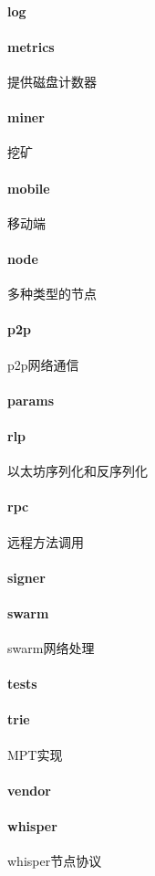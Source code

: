 \documentclass[UTF8]{ctexart}
\begin{document}
\paragraph{log}
\paragraph{metrics} 提供磁盘计数器
\paragraph{miner} 挖矿
\paragraph{mobile} 移动端
\paragraph{node} 多种类型的节点
\paragraph{p2p} p2p网络通信
\paragraph{params}
\paragraph{rlp} 以太坊序列化和反序列化
\paragraph{rpc} 远程方法调用
\paragraph{signer}
\paragraph{swarm} swarm网络处理
\paragraph{tests}
\paragraph{trie} MPT实现
\paragraph{vendor}
\paragraph{whisper}  whisper节点协议
\ifx\allfiles\undefined
\end{document}
